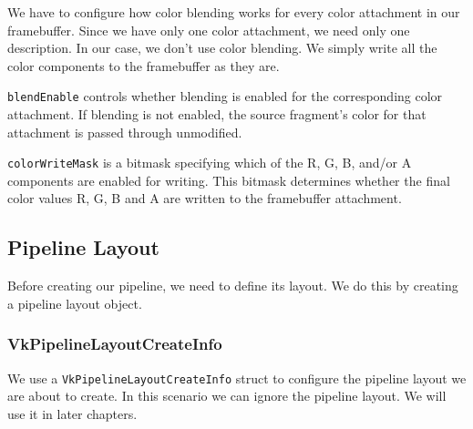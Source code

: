 We have to configure how color blending works for every color attachment
in our framebuffer.
Since we have only one color attachment, we need only one description.
In our case, we don't use color blending.
We simply write all the color components to the framebuffer as they are.

\begin{minipage}{\linewidth}{\noindent}
    
\end{minipage}

\texttt{blendEnable} controls whether blending is enabled for the corresponding
color attachment.
If blending is not enabled, the source fragment's color for that attachment
is passed through unmodified.

\texttt{colorWriteMask} is a bitmask specifying which of the R, G, B, and/or A
components are enabled for writing.
This bitmask determines whether the final color values R, G, B and A are written
to the framebuffer attachment.

\subsection{Pipeline Layout}

Before creating our pipeline, we need to define its layout.
We do this by creating a pipeline layout object.

\begin{minipage}{\linewidth}{\noindent}
    
\end{minipage}

\subsubsection{VkPipelineLayoutCreateInfo}

We use a \texttt{VkPipelineLayoutCreateInfo} struct to configure the pipeline
layout we are about to create.
In this scenario we can ignore the pipeline layout.
We will use it in later chapters.

\begin{minipage}{\linewidth}{\noindent}
    
\end{minipage}

